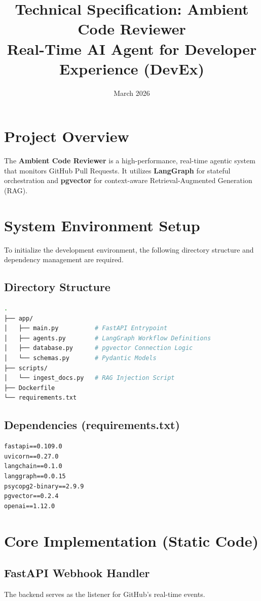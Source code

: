 \documentclass[11pt]{article}
\title{\textbf{Technical Specification: Ambient Code Reviewer \\ \large Real-Time AI Agent for Developer Experience (DevEx)}}
\date{March 2026}
\begin{document}
\maketitle

\section{Project Overview}
The \textbf{Ambient Code Reviewer} is a high-performance, real-time agentic system that monitors GitHub Pull Requests. It utilizes \textbf{LangGraph} for stateful orchestration and \textbf{pgvector} for context-aware Retrieval-Augmented Generation (RAG).

\section{System Environment Setup}
To initialize the development environment, the following directory structure and dependency management are required.

\subsection{Directory Structure}
\begin{lstlisting}[language=bash]
.
├── app/
│   ├── main.py          # FastAPI Entrypoint
│   ├── agents.py        # LangGraph Workflow Definitions
│   ├── database.py      # pgvector Connection Logic
│   └── schemas.py       # Pydantic Models
├── scripts/
│   └── ingest_docs.py   # RAG Injection Script
├── Dockerfile
└── requirements.txt
\end{lstlisting}

\subsection{Dependencies (requirements.txt)}
\begin{lstlisting}
fastapi==0.109.0
uvicorn==0.27.0
langchain==0.1.0
langgraph==0.0.15
psycopg2-binary==2.9.9
pgvector==0.2.4
openai==1.12.0
\end{lstlisting}

\section{Core Implementation (Static Code)}

\subsection{FastAPI Webhook Handler}
The backend serves as the listener for GitHub's real-time events.
\end{document}

